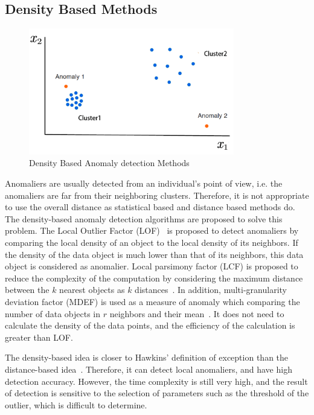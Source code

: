 \subsection{Density Based Methods}
\begin{figure}
  \centering
  \includegraphics[width=0.8\textwidth]{figures/cluster.png}
  \caption{Density Based  Anomaly detection Methods}\label{fig:Density}
\end{figure}

Anomaliers are usually detected from an individual's point of view,
i.e.
the anomaliers are far from their neighboring clusters.
Therefore,
it is not appropriate to use the overall distance as statistical based and distance based methods do.
The density-based anomaly detection algorithms are proposed to solve this problem.
The Local Outlier Factor (LOF)~\cite{breunig2000lof}
is proposed to detect anomaliers by comparing the local density of an object to the local density of its neighbors.
If the density of the data object is
much lower than that of its neighbors,
this data object is considered as anomalier.
Local parsimony factor (LCF) is proposed to
reduce the complexity of the
computation by considering the maximum distance between
the $k$ nearest objects as $k$ distances~\cite{agyemang2004algorithm}.
In addition,
multi-granularity deviation factor (MDEF) is used as a measure of anomaly which comparing the number of data objects in $r$ neighbors and their mean~\cite{papadimitriou2003loci}.
It does not need to calculate the density of the data points,
and the efficiency of the calculation is greater than LOF.

The density-based idea is closer to Hawkins' definition of
exception than the distance-based idea~\cite{hawkins1980identification}.
Therefore,
it can detect local anomaliers,
and have high detection accuracy.
However,
the time complexity is still very high,
and the result of detection is sensitive to
the selection of parameters such as the threshold of the outlier,
which is difficult to determine.


